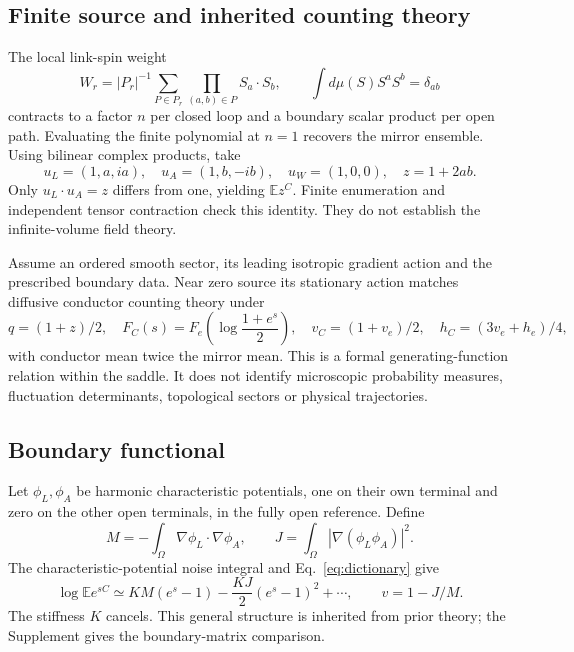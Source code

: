 \documentclass[11pt,a4paper]{article}
\newcommand{\E}{\mathbb E}
\begin{document}
\subsection{Finite source and inherited counting theory}
The local link-spin weight
\[
W_r=|P_r|^{-1}\sum_{P\in P_r}\prod_{(a,b)\in P}S_a\cdot S_b,\qquad
\int d\mu(S)S^aS^b=\delta_{ab}
\]
contracts to a factor \(n\) per closed loop and a boundary scalar product
per open path. Evaluating the finite polynomial at \(n=1\) recovers the mirror
ensemble. Using bilinear complex products, take
\[
u_L=(1,a,ia),\quad u_A=(1,b,-ib),\quad u_W=(1,0,0),\quad z=1+2ab.
\]
Only \(u_L\cdot u_A=z\) differs from one, yielding \(\E z^C\).
Finite enumeration and independent tensor contraction check this identity.
They do not establish the infinite-volume field theory.

Assume an ordered smooth sector, its leading isotropic gradient action and
the prescribed boundary data. Near zero source its stationary action matches
diffusive conductor counting theory \cite{NB} under
\begin{equation}
q=(1+z)/2,\quad
F_C(s)=F_e\!\left(\log\frac{1+e^s}{2}\right),\quad
v_C=(1+v_e)/2,\quad h_C=(3v_e+h_e)/4 ,
\label{eq:dictionary}
\end{equation}
with conductor mean twice the mirror mean. This is a formal generating-function
relation within the saddle. It does not identify microscopic probability
measures, fluctuation determinants, topological sectors or physical trajectories.

\subsection{Boundary functional}
Let \(\phi_L,\phi_A\) be harmonic characteristic potentials, one on their
own terminal and zero on the other open terminals, in the fully open reference.
Define
\begin{equation}
M=-\int_\Omega\nabla\phi_L\cdot\nabla\phi_A,\qquad
J=\int_\Omega|\nabla(\phi_L\phi_A)|^2 .
\end{equation}
The characteristic-potential noise integral \cite{SL} and
Eq.~\eqref{eq:dictionary} give
\begin{equation}
\log\E e^{sC}\simeq KM(e^s-1)-\frac{KJ}{2}(e^s-1)^2+\cdots,\qquad
v=1-J/M .
\label{eq:variance}
\end{equation}
The stiffness \(K\) cancels. This general structure is inherited from prior
theory; the Supplement gives the boundary-matrix comparison.
\end{document}
